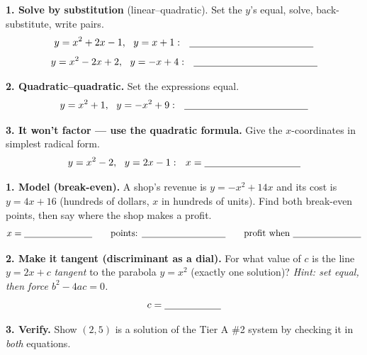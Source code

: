 \documentclass[10pt]{article}
\begin{document}
\begin{tcolorbox}[colback=white, colframe=black!40, title=\textbf{Tier A --- Approaching Proficiency},
    fonttitle=\bfseries, arc=1.5mm, left=3mm, right=3mm, top=2mm, bottom=2mm, breakable]
\textbf{1. Solve by substitution} (linear--quadratic). Set the $y$'s equal, solve, back-substitute, write pairs.
\[ y=x^2+2x-1,\ \ y=x+1:\ \ \blank{4.4cm} \]
\[ y=x^2-2x+2,\ \ y=-x+4:\ \ \blank{4.4cm} \]

\textbf{2. Quadratic--quadratic.} Set the expressions equal.
\[ y=x^2+1,\ \ y=-x^2+9:\ \ \blank{4.4cm} \]

\textbf{3. It won't factor --- use the quadratic formula.} Give the $x$-coordinates in simplest radical form.
\[ y=x^2-2,\ \ y=2x-1:\ \ x=\blank{3.4cm} \]
\end{tcolorbox}

\begin{tcolorbox}[colback=white, colframe=black!40, title=\textbf{Tier E --- Extension},
    fonttitle=\bfseries, arc=1.5mm, left=3mm, right=3mm, top=2mm, bottom=2mm, breakable]
\textbf{1. Model (break-even).} A shop's revenue is $y=-x^2+14x$ and its cost is $y=4x+16$ (hundreds of dollars,
$x$ in hundreds of units). Find both break-even points, then say where the shop makes a profit.
\[ x=\blank{2.6cm} \qquad\text{points: } \blank{3.2cm} \qquad\text{profit when } \blank{2.6cm} \]

\textbf{2. Make it tangent (discriminant as a dial).} For what value of $c$ is the line $y=2x+c$ \emph{tangent} to
the parabola $y=x^2$ (exactly one solution)? \emph{Hint: set equal, then force $b^2-4ac=0$.}
\[ c=\blank{2.0cm} \]

\textbf{3. Verify.} Show $(2,5)$ is a solution of the Tier A \#2 system by checking it in \emph{both} equations.
\end{tcolorbox}
\end{document}
